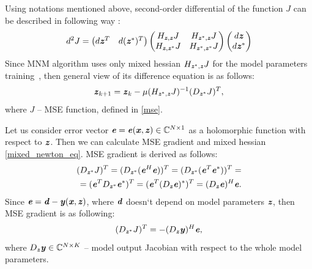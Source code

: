 \documentclass[12pt]{article}
\newcommand{\bit}[1]{\ensuremath{\textbf{\textit{#1}}}}
\begin{document}
Using notations mentioned above, second-order differential of the function $J$ can be described in following way \cite{complex_deriv}:
\begin{equation}
    d^2J=\begin{pmatrix}
        d\bit{z}^T & d(\bit{z}^*)^T
    \end{pmatrix}
    \begin{pmatrix}
        H_{\bit{z}, \bit{z}}J & H_{\bit{z}^*, \bit{z}}J \\
        H_{\bit{z}, \bit{z}^*}J & H_{\bit{z}^*, \bit{z}^*}J
    \end{pmatrix}
    \begin{pmatrix}
        d\bit{z} \\ d\bit{z}^*
    \end{pmatrix}
\end{equation}
Since MNM algorithm uses only mixed hessian $H_{\bit{z}^*, \bit{z}}J$ for the model parameters training~\cite{mixed_newton}, then general view of its difference equation is as follows:
\begin{equation}
    \bit{z}_{k+1}=\bit{z}_k-\mu (H_{\bit{z}^*, \bit{z}} J)^{-1}(D_{\bit{z}^*}J)^T,
    \label{mixed_newton_eq}
\end{equation}
where $J$ -- MSE function, defined in \eqref{mse}.

Let us consider error vector $\bit{e}=\bit{e}(\bit{x}, \bit{z})\in\mathbb{C}^{N\times 1}$ as a holomorphic function with respect to \bit{z}. Then we can calculate MSE gradient and mixed hessian \eqref{mixed_newton_eq}. MSE gradient is derived as follows:
\begin{align}
    (D_{\bit{z}^*}J)^T=
    (D_{\bit{z}^*}(\bit{e}^H\bit{e}))^T=(D_{\bit{z}^*}(\bit{e}^T\bit{e}^*))^T= \nonumber \\=(\bit{e}^TD_{\bit{z}^*}\bit{e}^*)^T=(\bit{e}^T(D_{\bit{z}}\bit{e})^*)^T=(D_{\bit{z}}\bit{e})^H\bit{e}.
\end{align}
Since $\bit{e}=\bit{d}-\bit{y}(\bit{x}, \bit{z})$, where \bit{d} doesn`t depend on model parameters \bit{z}, then MSE gradient is as following:
\begin{equation}
    (D_{\bit{z}^*}J)^T=-(D_{\bit{z}}\bit{y})^H\bit{e},
    \label{grad}
\end{equation}
where $D_{\bit{z}}\bit{y}\in\mathbb{C}^{N\times K}$ -- model output Jacobian with respect to the whole model parameters.
\end{document}
